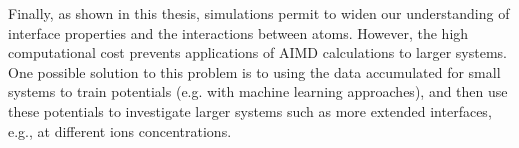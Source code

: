 Finally, as shown in this thesis, \abinitio simulations permit to widen our understanding of interface properties and the interactions between atoms.
However, the high computational cost prevents applications of AIMD calculations to larger systems.
One possible solution to this problem is to using the \abinitio data accumulated for small systems to train potentials (e.g. with machine learning approaches\cite{Norvig2010}), 
and then use these potentials to investigate larger systems such as more extended interfaces, 
e.g., at different ions concentrations\cite{Behler2007,Behler2011,Behler2014,Kolb2017}.



